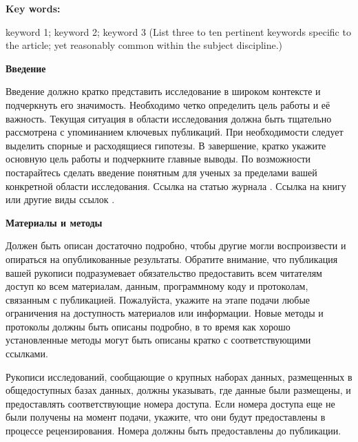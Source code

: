 \documentclass[i-edu.uz,journal,article,submit,pdftex,moreauthors]{Definitions/i-edu.uz}
\begin{document}
\begin{sloppypar}
\noindent\textbf{ Key words:} {keyword 1; keyword 2; keyword 3 (List three to ten pertinent keywords specific to the article; yet reasonably common within the subject discipline.)\\

\setcounter{section}{-0} %

\noindent\textbf{Введение}

Введение должно кратко представить исследование в широком контексте и подчеркнуть его значимость. Необходимо четко определить цель работы и её важность. Текущая ситуация в области исследования должна быть тщательно рассмотрена с упоминанием ключевых публикаций. При необходимости следует выделить спорные и расходящиеся гипотезы. В завершение, кратко укажите основную цель работы и подчеркните главные выводы. По возможности постарайтесь сделать введение понятным для ученых за пределами вашей конкретной области исследования. Ссылка на статью журнала \cite{ref-journal}. Ссылка на книгу \cite{ref-book1,ref-book2} или другие виды ссылок \cite{ref-unpublish,ref-communication,ref-proceeding}.





\noindent\textbf{Материалы и методы}

 Должен быть описан достаточно подробно, чтобы другие могли воспроизвести и опираться на опубликованные результаты. Обратите внимание, что публикация вашей рукописи подразумевает обязательство предоставить всем читателям доступ ко всем материалам, данным, программному коду и протоколам, связанным с публикацией. Пожалуйста, укажите на этапе подачи любые ограничения на доступность материалов или информации. Новые методы и протоколы должны быть описаны подробно, в то время как хорошо установленные методы могут быть описаны кратко с соответствующими ссылками.

Рукописи исследований, сообщающие о крупных наборах данных, размещенных в общедоступных базах данных, должны указывать, где данные были размещены, и предоставлять соответствующие номера доступа. Если номера доступа еще не были получены на момент подачи, укажите, что они будут предоставлены в процессе рецензирования. Номера должны быть предоставлены до публикации.

}
\end{sloppypar}
\end{document}
